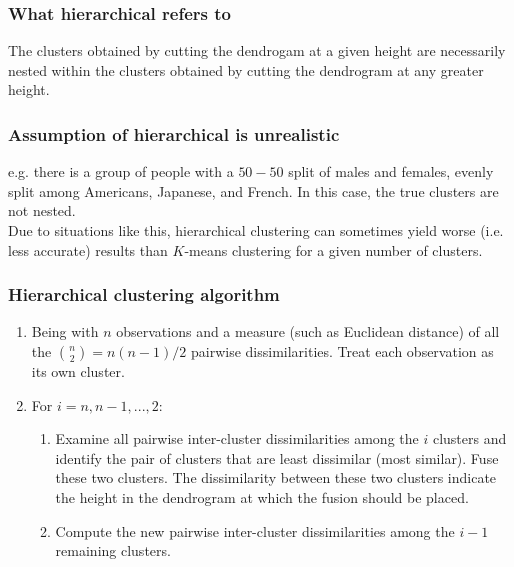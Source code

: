 \documentclass[11pt]{article}
\begin{document}
\subsubsection*{What hierarchical refers to}
\noindent The clusters obtained by cutting the dendrogam at a given height are necessarily nested within the clusters obtained by cutting the dendrogram at any greater height.

\subsubsection*{Assumption of hierarchical is unrealistic}
\noindent e.g. there is a group of people with a $50-50$ split of males and females, evenly split among Americans, Japanese, and French. In this case, the true clusters are not nested. \\

\noindent Due to situations like this, hierarchical clustering can sometimes yield worse (i.e. less accurate) results than $K$-means clustering for a given number of clusters.

\subsubsection{Hierarchical clustering algorithm}
\begin{enumerate}
    \item Being with $n$ observations and a measure (such as Euclidean distance) of all the $\binom{n}{2} = n(n-1)/2$ pairwise dissimilarities. Treat each observation as its own cluster.
    \item For $i = n,n-1,...,2$:
        \begin{enumerate}
            \item Examine all pairwise inter-cluster dissimilarities among the $i$ clusters and identify the pair of clusters that are least dissimilar (most similar). Fuse these two clusters. The dissimilarity between these two clusters indicate the height in the dendrogram at which the fusion should be placed.
            \item Compute the new pairwise inter-cluster dissimilarities among the $i-1$ remaining clusters.
        \end{enumerate}
\end{enumerate} \phantom{i} \\
\end{document}
